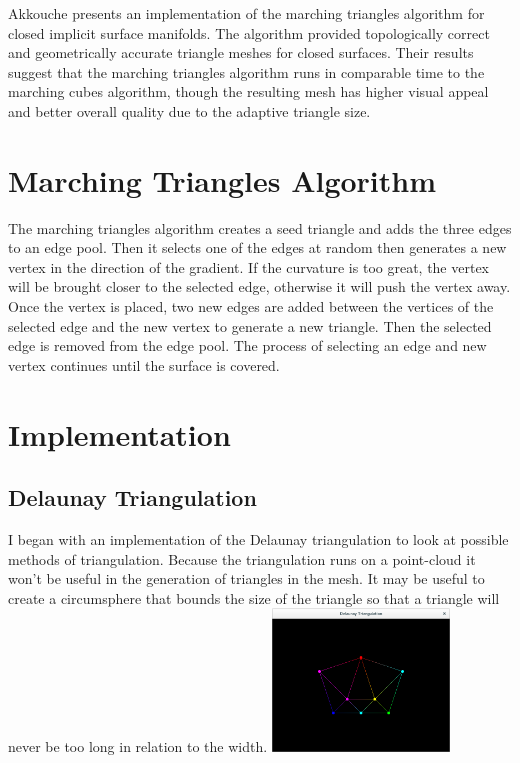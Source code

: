 \documentclass[conference]{acmsiggraph}
\begin{document}
Akkouche presents an implementation of the marching triangles algorithm for
closed implicit surface manifolds\cite{Akkouche2001}. The algorithm provided
topologically correct and geometrically accurate triangle meshes for closed
surfaces. Their results suggest that the marching triangles algorithm runs in
comparable time to the marching cubes algorithm, though the resulting mesh has
higher visual appeal and better overall quality due to the adaptive triangle
size.

\section{Marching Triangles Algorithm}
The marching triangles algorithm creates a seed triangle and adds the three
edges to an edge pool. Then it selects one of the edges at random then
generates a new vertex in the direction of the gradient. If the curvature is
too great, the vertex will be brought closer to the selected edge, otherwise it
will push the vertex away. Once the vertex is placed, two new edges are added
between the vertices of the selected edge and the new vertex to generate a new
triangle. Then the selected edge is removed from the edge pool. The process of
selecting an edge and new vertex continues until the surface is covered.

\section {Implementation}

\subsection{Delaunay Triangulation}
I began with an implementation of the Delaunay triangulation to look at
possible methods of triangulation. Because the triangulation runs on a
point-cloud it won't be useful in the generation of triangles in the mesh. It
may be useful to create a circumsphere that bounds the size of the triangle so
that a triangle will never be too long in relation to the width.
\includegraphics[height=1.5in]{images/Triangulated.png}
\end{document}
